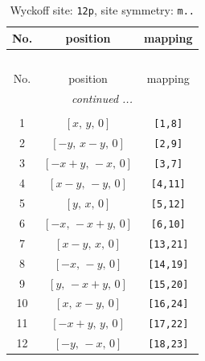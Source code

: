 \documentclass[fleqn,8pt]{jsarticle}
\begin{document}
\begin{longtable}{ccc}
\caption{Wyckoff site: {\tt 12p}, site symmetry: {\tt m..}}
 \\
 \hline \hline
No. & position & mapping \\ \hline \endfirsthead

\multicolumn{2}{l}{\tablename\ \thetable{}} \\
 \hline \hline
No. & position & mapping \\ \hline \endhead

 \hline \hline
\multicolumn{2}{r}{\footnotesize\it continued ...} \\ \endfoot

 \hline \hline
\multicolumn{2}{r}{} \\ \endlastfoot

1 & $\left[ x,\, y,\, 0 \right]$ & {\tt [1,8]} \\ \hline
2 & $\left[ - y,\, x - y,\, 0 \right]$ & {\tt [2,9]} \\ \hline
3 & $\left[ - x + y,\, - x,\, 0 \right]$ & {\tt [3,7]} \\ \hline
4 & $\left[ x - y,\, - y,\, 0 \right]$ & {\tt [4,11]} \\ \hline
5 & $\left[ y,\, x,\, 0 \right]$ & {\tt [5,12]} \\ \hline
6 & $\left[ - x,\, - x + y,\, 0 \right]$ & {\tt [6,10]} \\ \hline
7 & $\left[ x - y,\, x,\, 0 \right]$ & {\tt [13,21]} \\ \hline
8 & $\left[ - x,\, - y,\, 0 \right]$ & {\tt [14,19]} \\ \hline
9 & $\left[ y,\, - x + y,\, 0 \right]$ & {\tt [15,20]} \\ \hline
10 & $\left[ x,\, x - y,\, 0 \right]$ & {\tt [16,24]} \\ \hline
11 & $\left[ - x + y,\, y,\, 0 \right]$ & {\tt [17,22]} \\ \hline
12 & $\left[ - y,\, - x,\, 0 \right]$ & {\tt [18,23]} \\
\end{longtable}
\renewcommand{\arraystretch}{1.2}
\end{document}
